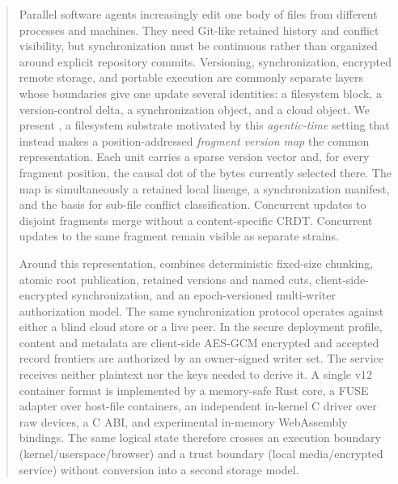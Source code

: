 \begin{abstract}
Parallel software agents increasingly edit one body of files from different
processes and machines.  They need Git-like retained history and conflict
visibility, but synchronization must be continuous rather than organized around
explicit repository commits.  Versioning, synchronization, encrypted remote
storage, and portable execution are commonly separate layers whose boundaries
give one update several identities: a filesystem block, a version-control
delta, a synchronization object, and a cloud object.  We present \sfs{}, a
filesystem substrate motivated by this \emph{agentic-time} setting that instead
makes a position-addressed \emph{fragment version map} the common
representation.  Each unit carries a
sparse version vector and, for every fragment position, the causal dot of the
bytes currently selected there.  The map is simultaneously a retained local
lineage, a synchronization manifest, and the basis for sub-file conflict
classification.  Concurrent updates to disjoint fragments merge without a
content-specific CRDT.  Concurrent updates to the same fragment remain visible
as separate strains.

Around this representation, \sfs{} combines deterministic fixed-size chunking,
atomic root publication, retained versions and named cuts, client-side-encrypted
synchronization, and an epoch-versioned multi-writer authorization model.  The
same synchronization protocol operates against either a blind cloud store or a
live peer.  In the secure deployment profile, content and metadata are
client-side AES-GCM encrypted and accepted record frontiers are authorized by
an owner-signed writer set.  The service receives neither plaintext nor the keys
needed to derive it.  A single v12 container format is implemented by a
memory-safe Rust core, a FUSE adapter over host-file containers, an independent
in-kernel C driver over raw devices, a C ABI, and experimental in-memory
WebAssembly bindings.  The same logical state therefore crosses an execution
boundary (kernel/userspace/browser) and a trust boundary (local media/encrypted
service) without conversion into a second storage model.


\end{abstract}
